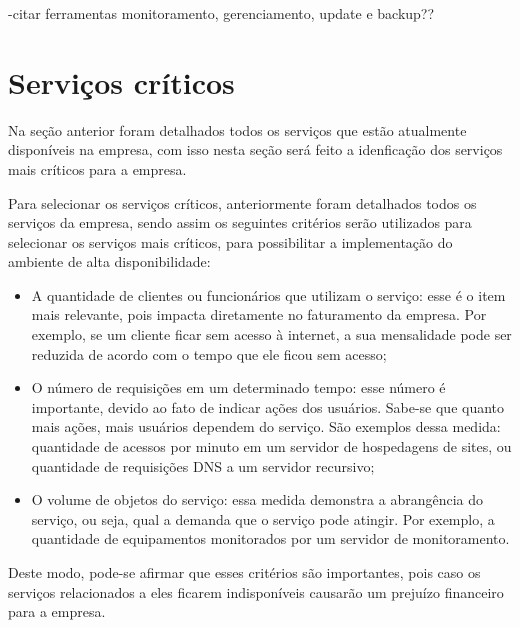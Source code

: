 -citar ferramentas monitoramento, gerenciamento, update e backup??

\section{Serviços críticos}
\label{section:servcrit}

Na seção anterior foram detalhados todos os serviços que estão atualmente disponíveis na empresa, com isso nesta seção será feito a 
idenficação dos serviços mais críticos para a empresa.

Para selecionar os serviços críticos, anteriormente foram detalhados todos os serviços da empresa, sendo assim os seguintes critérios serão 
utilizados para selecionar os serviços mais críticos, para possibilitar a implementação do ambiente de alta disponibilidade: 
\begin{itemize}
 \item A quantidade de clientes ou funcionários que utilizam o serviço: esse é o item mais relevante, pois impacta diretamente no faturamento
 da empresa. Por exemplo, se um cliente ficar sem acesso à internet, a sua mensalidade pode ser reduzida de acordo com o tempo que ele ficou
 sem acesso; 
 \item O número de requisições em um determinado tempo: esse número é importante, devido ao fato de indicar ações dos usuários. Sabe-se que
 quanto mais ações, mais usuários dependem do serviço. São exemplos dessa medida: quantidade de acessos por minuto em um servidor de hospedagens 
 de sites, ou quantidade de requisições \ac{DNS} a um servidor recursivo;
 \item O volume de objetos do serviço: essa medida demonstra a abrangência do serviço, ou seja, qual a demanda que o serviço pode atingir.
 Por exemplo, a quantidade de equipamentos monitorados por um servidor de monitoramento.
\end{itemize}

Deste modo, pode-se afirmar que esses critérios são importantes, pois caso os serviços relacionados a eles ficarem indisponíveis causarão 
um prejuízo financeiro para a empresa. 

